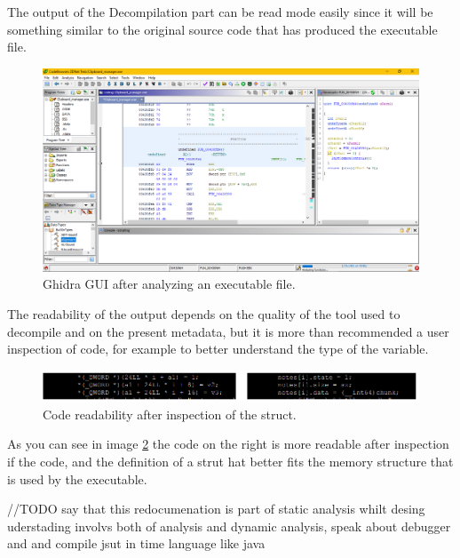 \documentclass{article}
\begin{document}
The output of the Decompilation part can be read mode easily since it will be something similar to the original source code that has produced the executable file. 
\begin{figure}[htp]
    \centering
    \includegraphics[width=1\textwidth]{images/ghidra.png}
    \caption{Ghidra GUI after analyzing an executable file.}
    \label{fig:decompilationoutput}
\end{figure}
The readability of the output depends on the quality of the tool used to decompile and on the present metadata, but it is more than recommended a user inspection of code, for example to better understand the type of the variable.
\begin{figure}[htp]
    \centering
    \includegraphics[width=1\textwidth]{images/coderead.png}
    \caption{Code readability after inspection of the struct.}
    \label{fig:coderead}
\end{figure}
As you can see in image \ref{fig:coderead} the code on the right is more readable after inspection if the code, and the definition of a strut hat better fits the memory structure that is used by the executable.

//TODO say that this redocumenation is part of static analysis whilt desing uderstading involvs both of analysis and dynamic analysis, speak about debugger and and compile jsut in time language like java
\end{document}
